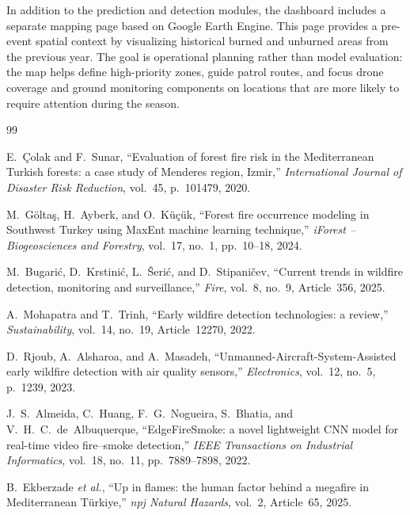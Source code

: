 \documentclass[11pt,a4paper]{report}
\begin{document}
In addition to the prediction and detection modules, the dashboard includes a separate mapping page based on Google Earth Engine. This page provides a pre-event spatial context by visualizing historical burned and unburned areas from the previous year. The goal is operational planning rather than model evaluation: the map helps define high-priority zones, guide patrol routes, and focus drone coverage and ground monitoring components on locations that are more likely to require attention during the season.



\clearpage

\begin{thebibliography}{99}

E.~\c{C}olak and F.~Sunar, ``Evaluation of forest fire risk in the Mediterranean Turkish forests: a case study of Menderes region, Izmir,'' \emph{International Journal of Disaster Risk Reduction}, vol.~45, p.~101479, 2020.

M.~G\"{o}lta\c{s}, H.~Ayberk, and O.~K\"{u}\c{c}\"{u}k, ``Forest fire occurrence modeling in Southwest Turkey using MaxEnt machine learning technique,'' \emph{iForest -- Biogeosciences and Forestry}, vol.~17, no.~1, pp.~10--18, 2024.

M.~Bugari\'{c}, D.~Krstini\'{c}, L.~\v{S}eri\'{c}, and D.~Stipani\v{c}ev, ``Current trends in wildfire detection, monitoring and surveillance,'' \emph{Fire}, vol.~8, no.~9, Article~356, 2025.

A.~Mohapatra and T.~Trinh, ``Early wildfire detection technologies: a review,'' \emph{Sustainability}, vol.~14, no.~19, Article~12270, 2022.

D.~Rjoub, A.~Alsharoa, and A.~Masadeh, ``Unmanned-Aircraft-System-Assisted early wildfire detection with air quality sensors,'' \emph{Electronics}, vol.~12, no.~5, p.~1239, 2023.

J.~S.~Almeida, C.~Huang, F.~G.~Nogueira, S.~Bhatia, and V.~H.~C.~de~Albuquerque, ``EdgeFireSmoke: a novel lightweight CNN model for real-time video fire--smoke detection,'' \emph{IEEE Transactions on Industrial Informatics}, vol.~18, no.~11, pp.~7889--7898, 2022.

B.~Ekberzade \emph{et al.}, ``Up in flames: the human factor behind a megafire in Mediterranean T\"{u}rkiye,'' \emph{npj Natural Hazards}, vol.~2, Article~65, 2025.


\end{thebibliography}
\end{document}
